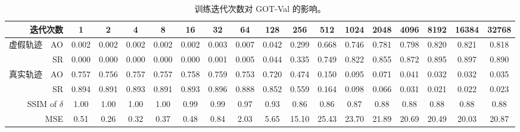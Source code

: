 \begin{table}[t]
\centering
\begin{tabular}{rrcccccccccccccccc} 
\toprule
\multicolumn{2}{r}{迭代次数}     & 1     & 2     & 4     & 8     & 16    & 32    & 64    & 128   & 256   & 512   & 1024  & 2048  & 4096  & 8192  & 16384 & 32768  \\ 
\midrule
\multirow{2}{*}{虚假轨迹} & AO    & 0.002 & 0.002 & 0.002 & 0.002 & 0.002 & 0.003 & 0.007 & 0.042 & 0.299 & 0.668 & 0.746 & 0.781 & 0.798 & 0.820 & 0.821 & 0.818  \\
                                 & SR    & 0.000 & 0.000 & 0.000 & 0.000 & 0.000 & 0.001 & 0.005 & 0.044 & 0.335 & 0.749 & 0.822 & 0.855 & 0.872 & 0.895 & 0.897 & 0.890  \\ 
\midrule
\multirow{2}{*}{真实轨迹} & AO    & 0.757 & 0.756 & 0.757 & 0.757 & 0.758 & 0.759 & 0.753 & 0.720 & 0.474 & 0.150 & 0.095 & 0.071 & 0.041 & 0.032 & 0.032 & 0.035  \\
                                 & SR    & 0.894 & 0.891 & 0.893 & 0.891 & 0.893 & 0.896 & 0.888 & 0.852 & 0.559 & 0.164 & 0.098 & 0.066 & 0.031 & 0.021 & 0.022 & 0.023  \\ 
\midrule
\multicolumn{2}{r}{SSIM of $\delta$}                        & 1.00  & 1.00  & 1.00  & 1.00  & 0.99  & 0.99  & 0.97  & 0.93  & 0.86  & 0.86  & 0.87  & 0.88  & 0.88  & 0.88  & 0.88  & 0.88   \\
\multicolumn{2}{r}{MSE}                         & 0.51  & 0.26  & 0.32  & 0.37  & 0.48  & 0.84  & 2.03  & 5.65  & 15.10 & 25.43 & 23.70 & 21.89 & 20.69 & 20.49 & 20.03 & 20.87  \\
\bottomrule
\end{tabular}
\caption{训练迭代次数对 GOT-Val 的影响。}
\label{tab:iter}
\end{table}


